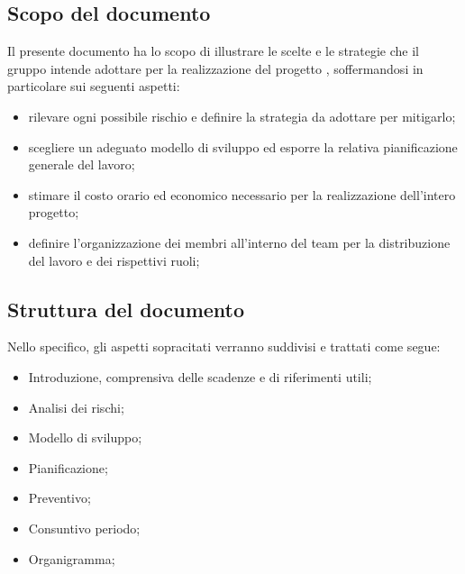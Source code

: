 \subsection {Scopo del documento}
    Il presente documento ha lo scopo di illustrare le scelte e le strategie che il gruppo \Gruppo{} intende adottare per la realizzazione del progetto \NomeProgetto{}, soffermandosi in particolare sui seguenti aspetti:
    \begin{itemize}
        \item rilevare ogni possibile rischio e definire la strategia da adottare per mitigarlo;
        \item scegliere un adeguato modello di sviluppo ed esporre la relativa pianificazione generale del lavoro;
        \item stimare il costo orario ed economico necessario per la realizzazione dell'intero progetto;
        \item definire l'organizzazione dei membri all'interno del team per la distribuzione del lavoro e dei rispettivi ruoli;
    \end{itemize}

\subsection{Struttura del documento}
    Nello specifico, gli aspetti sopracitati verranno suddivisi e trattati come segue:
    \begin{itemize}
        \item Introduzione, comprensiva delle scadenze e di riferimenti utili;
        \item Analisi dei rischi;
        \item Modello di sviluppo;
        \item Pianificazione;
        \item Preventivo;
        \item Consuntivo periodo;
        \item Organigramma;
    \end{itemize}

